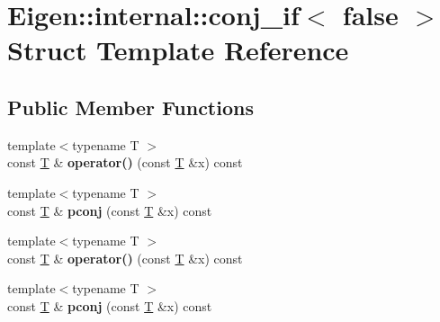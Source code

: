 \hypertarget{struct_eigen_1_1internal_1_1conj__if_3_01false_01_4}{}\section{Eigen\+:\+:internal\+:\+:conj\+\_\+if$<$ false $>$ Struct Template Reference}
\label{struct_eigen_1_1internal_1_1conj__if_3_01false_01_4}
\subsection*{Public Member Functions}
\begin{DoxyCompactItemize}
\item 
\mbox{\label{struct_eigen_1_1internal_1_1conj__if_3_01false_01_4_a639324040d96a2e3f5e40c96dd2b5065}} 
{\footnotesize template$<$typename T $>$ }\\const \hyperlink{group___sparse_core___module}{T} \& {\bfseries operator()} (const \hyperlink{group___sparse_core___module}{T} \&x) const
\item 
\mbox{\label{struct_eigen_1_1internal_1_1conj__if_3_01false_01_4_a25e035754a0b3cad3af8cca1ae57abb9}} 
{\footnotesize template$<$typename T $>$ }\\const \hyperlink{group___sparse_core___module}{T} \& {\bfseries pconj} (const \hyperlink{group___sparse_core___module}{T} \&x) const
\item 
\mbox{\label{struct_eigen_1_1internal_1_1conj__if_3_01false_01_4_a639324040d96a2e3f5e40c96dd2b5065}} 
{\footnotesize template$<$typename T $>$ }\\const \hyperlink{group___sparse_core___module}{T} \& {\bfseries operator()} (const \hyperlink{group___sparse_core___module}{T} \&x) const
\item 
\mbox{\label{struct_eigen_1_1internal_1_1conj__if_3_01false_01_4_a25e035754a0b3cad3af8cca1ae57abb9}} 
{\footnotesize template$<$typename T $>$ }\\const \hyperlink{group___sparse_core___module}{T} \& {\bfseries pconj} (const \hyperlink{group___sparse_core___module}{T} \&x) const
\end{DoxyCompactItemize}


